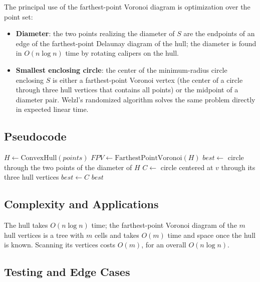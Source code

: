 The principal use of the farthest-point Voronoi diagram is optimization over
the point set:
\begin{itemize}
\item \textbf{Diameter}: the two points realizing the diameter of $S$ are the
  endpoints of an edge of the farthest-point Delaunay diagram of the hull; the
  diameter is found in $O(n \log n)$ time by rotating calipers on the hull.
\item \textbf{Smallest enclosing circle}: the center of the minimum-radius
  circle enclosing $S$ is either a farthest-point Voronoi vertex (the center
  of a circle through three hull vertices that contains all points) or the
  midpoint of a diameter pair. Welzl's randomized algorithm
  \cite{welzl1991} solves the same problem directly in expected linear time.
\end{itemize}

\subsection{Pseudocode}

\begin{algorithm}[htbp]
\caption{Smallest Enclosing Circle via Farthest-Point Voronoi}
\label{alg:farthest_enclosing_circle}
\begin{algorithmic}[1]
  \State $H \gets \text{ConvexHull}(points)$
  \State $FPV \gets \text{FarthestPointVoronoi}(H)$
  \State $best \gets$ circle through the two points of the diameter of $H$
    \State $C \gets$ circle centered at $v$ through its three hull vertices
      \State $best \gets C$
    \EndIf
  \EndFor
  \State \Return $best$
\EndFunction
\end{algorithmic}
\end{algorithm}

\subsection{Complexity and Applications}

The hull takes $O(n \log n)$ time; the farthest-point Voronoi diagram of the
$m$ hull vertices is a tree with $m$ cells and takes $O(m)$ time and space
once the hull is known. Scanning its vertices costs $O(m)$, for an overall
$O(n \log n)$.

\subsection{Testing and Edge Cases}

